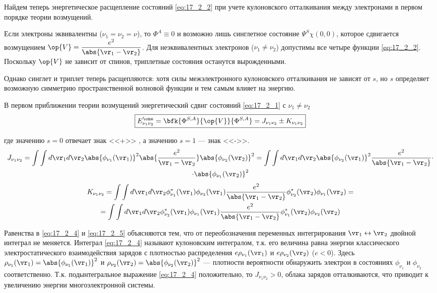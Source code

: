 Найдем теперь энергетическое расщепление состояний \eqref{eq:17_2_2} при учете кулоновского отталкивания между электронами в первом порядке теории возмущений.

Если электроны эквивалентны ($\nu_1 = \nu_2= \nu$), то $\Phi^A \equiv 0$ и возможно лишь синглетное состояние $\Psi^S \chi(0, 0)$, которое сдвигается возмущением $\op{V} = \dfrac{e^2}{\abs{\vr_1 - \vr_2}}$. Для неэквивалентных электронов ($\nu_1 \neq \nu_2$) допустимы все четыре функции \eqref{eq:17_2_2}. Поскольку $\op{V}$ не зависит от спинов, триплетные состояния останутся вырожденными.

Однако синглет и триплет теперь расщепляются: хотя силы межэлектронного кулоновского отталкивания не зависят от $s$, но $s$ определяет возможную симметрию пространственной волновой функции и тем самым влияет на энергию.

В первом приближении теории возмущений энергетический сдвиг состояний \eqref{eq:17_2_1} с $\nu_1 \neq \nu_2$
\begin{equation}
\label{eq:17_2_3}
\boxed{E_{\nu_1 \nu_2}^\one = \bfk{\Phi^{S, A}}{\op{V}}{\Phi^{S, A}} = J_{\nu_1 \nu_2} \pm K_{\nu_1 \nu_2}} 
\end{equation}

где значению $s = 0$ отвечает знак <<+>> , а значению $s = 1$ --- знак <<->>.
\begin{gather}
\label{eq:17_2_4}
J_{\nu_1 \nu_2} = \int \int d\vr_1 d\vr_2 \abs{\phi_{\nu_1}(\vr_1)}^2 \abs{\frac{e^2}{\vr_1 - \vr_2}} \abs{\phi_{\nu_2}(\vr_2)}^2 = \int \int d\vr_1 d\vr_2 \abs{\phi_{\nu_2}(\vr_1)}^2 \frac{e^2}{\abs{\vr_1 - \vr_2}} \cdot \nonumber \\ \cdot \abs{\phi_{\nu_1}(\vr_2)}^2
\end{gather}
\begin{gather}
\label{eq:17_2_5}
K_{\nu_1 \nu_2} = \int \int d\vr_1 d\vr_2 \phi^*_{\nu_1}(\vr_1) \phi_{\nu_2}(\vr_1)\frac{e^2}{\abs{\vr_1 - \vr_2}}  \phi^*_{\nu_2}(\vr_2) \phi_{\nu_1}(\vr_2) = \nonumber \\
= \int \int d\vr_1 d\vr_2 \phi^*_{\nu_2}(\vr_1) \phi_{\nu_1}(\vr_1)\frac{e^2}{\abs{\vr_1 - \vr_2}}  \phi^*_{\nu_1}(\vr_2) \phi_{\nu_2}(\vr_2)
\end{gather}

Равенства в \eqref{eq:17_2_4} и \eqref{eq:17_2_5} объясняются тем, что от переобозначения переменных интегрирования $\vr_1 \leftrightarrow \vr_2$ двойной интеграл не меняется. Интеграл \eqref{eq:17_2_4} называют кулоновским интегралом, т.к. его величина равна энергии классического электростатического взаимодействия зарядов с плотностью распределения $e\rho_{\nu_1}(\vr_1)$ и $e\rho_{\nu_2}(\vr_2)$ ($e < 0$). Здесь $\rho_{\nu_1}(\vr_1) = \abs{\phi_{\nu_1}(\vr_1)}^2$ и $\rho_{\nu_2}(\vr_2) = \abs{\phi_{\nu_2}(\vr_2)}^2$ --- плотности вероятности обнаружить электрон в состояниях $\phi_{\nu_1}$ и $\phi_{\nu_2}$ соответственно. Т.к. подынтегральное выражение \eqref{eq:17_2_4} положительно, то $J_{\nu_1 \nu_2} > 0$, облака зарядов отталкиваются, что приводит к увеличению энергии многоэлектронной системы.

